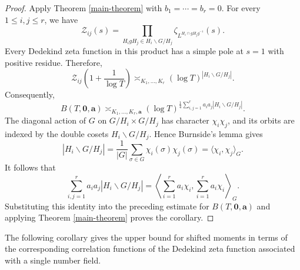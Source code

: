 \documentclass[twoside,reqno,11pt,a4paper]{amsart}
\numberwithin{equation}{section}
\theoremstyle{plain}
\theoremstyle{definition}
\theoremstyle{remark}
\newcommand{\calZ}{\mathcal Z}
\renewcommand{\le}{\leqslant}
\begin{document}
\begin{proof}
Apply Theorem \ref{main-theorem} with $b_1=\cdots=b_r=0$. For every $1\le i,j\le r$, we have
\begin{equation*}
	\calZ_{ij}(s)=
	\prod_{H_igH_j\in H_i\backslash G/H_j}
	\zeta_{L^{H_i\cap gH_jg^{-1}}}(s).
\end{equation*}
Every Dedekind zeta function in this product has a simple pole at $s=1$ with positive residue. Therefore,
\begin{equation*}
	\calZ_{ij}\left(1+\frac{1}{\log T}\right)
	\asymp_{K_1,\ldots,K_r}
	(\log T)^{|H_i\backslash G/H_j|}.
\end{equation*}
Consequently,
\begin{equation*}
	B(T,\mathbf 0,\mathbf a)
	\asymp_{K_1,\ldots,K_r,\mathbf a}
	(\log T)^{\frac{1}{4}\sum_{i,j=1}^{r}a_ia_j|H_i\backslash G/H_j|}.
\end{equation*}
The diagonal action of $G$ on $G/H_i\times G/H_j$ has character $\chi_i\chi_j$, and its orbits are indexed by the double cosets $H_i\backslash G/H_j$. Hence Burnside's lemma gives
\begin{equation*}
	|H_i\backslash G/H_j|
	=\frac{1}{|G|}\sum_{\sigma\in G}\chi_i(\sigma)\chi_j(\sigma)
	=\langle\chi_i,\chi_j\rangle_G.
\end{equation*}
It follows that
\begin{equation*}
	\sum_{i,j=1}^{r}a_ia_j|H_i\backslash G/H_j|
	=\left\langle\sum_{i=1}^{r}a_i\chi_i,\sum_{i=1}^{r}a_i\chi_i\right\rangle_G.
\end{equation*}
Substituting this identity into the preceding estimate for $B(T,\mathbf 0,\mathbf a)$ and applying Theorem \ref{main-theorem} proves the corollary.
			\end{proof}



            
            The following corollary gives the upper bound for shifted moments in terms of the corresponding correlation functions of the Dedekind zeta function associated with a single number field.
            
\end{document}

